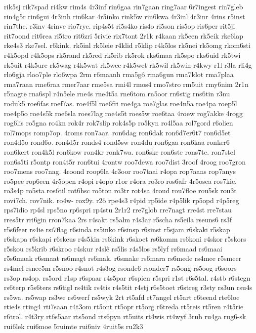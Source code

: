 {rik5sj
rik7spad
ri4kw
rim4s
4r3inf
rin6gaa
rin7gaan
ring7aar
6r7ingest
rin7gleb
rin4g5r
rin6gui
4r3inh
rin6kar
4r5inko
rink5w
rin6kwa
4r3inl
4r3inr
4rins
r5inst
rin7the.
r3inv
4rinve
rio7rye.
rip4s5t
ri5s4ko
ris4o
ri5son
ris5op
ris6per
rit5ji
rit7oond
rit6rea
ri5tro
rit6zri
5rivie
rix7tont
2r1k
r4kaan
rk5een
rk5eik
rke6lap
rke4s3
rke7sel.
r6kink.
rk5inl
rk5leie
r4klid
r5klip
r4k5los
rk5nei
rk5omg
rkom6sti
r4k5opd
r4k5ops
rk5rand
rk5red
rk5rib
rk5rok
rks6maa
rk5spo
rks6uid
rk5twi
rk5uit
r4k5ure
rk5wag
r4k5wat
rk5wee
r4k5wet
rk5wil
rk5win
r4kwy
r1l
r3la
rli4g
rlo6gja
rloo7ple
rlo6wpa
2rm
r6maanh
rma5gô
rma6gun
rma7klot
rma7plaa
rma7raan
rme6raa
rmer7aar
rme5sa
rmi4l
rmos4
rmo7stro
rm5uit
rmy6nim
2r1n
r5nagte
rna6spl
r4n5ele
rne4s
rne4t5a
rne6tom
rn5oor
rn6stig
rns6tin
r3nu
roduk5
roe6fas
roef7as.
roe4f5l
roe6fri
roe4ga
roe7glas
roe4n5a
roe4pa
roep5l
roe4p5o
roe4s5k
roe6sla
roes7lag
roe4s5t
roes5w
roe6taa
4roew
rog7akke
4rogg
rog6lis
ro5gna
ro4kn
rok4r
rok7slip
rok4s5p
ro5kyn
ro4l5aa
rol7gord
r6olien
rol7mops
romp7op.
4roms
ron7aar.
ron6dag
ron6dak
ron6d7er6t7
ron6d5et
ron4d5o
rond6o.
ron4d5r
ronds4
rond5sw
ron4du
ron6gaa
ron6kaa
ronker6
ron6kert
ron4k5l
ron6kow
ron4kr
ronk7wa.
ron6ske
ron6ste
rons7te.
ron7stel
ron6s5ti
r5ontp
ron4t5r
ron6tui
4rontw
roo7dewa
roo7dist
3roof
4roog
roo7gron
roo7mens
roo7nag.
4roond
roop6la
4r3oor
roo7taai
r4opa
rop7aans
rop7anys
ro5pee
rop6een
4r5open
r4opi
r4opo
r1or
r4ora
ro3ro
ros6afr
4r5osea
ros7kie.
ro3s4p
ro5sta
ros6til
rot6hsc
ro5ton
ro3tr
rot4sa
4roud
rou7floe
rou5sk
rou3t
rovi7ch.
rov7nik.
ro4w-
rox9y.
r2ö
rpe4s3
r4pid
rp5ide
r4p5lik
rp5opd
r4p5reg
rps7idio
rp4sl
rps5no
rp6spri
rp4stu
2r1r2
rre7glob
rre7nagt
rre4st
rre7stau
rres5tr
rri6gin
rron7kaa
2rs
r4sakt
rs5alm
r4s3ar
r5scha
rs5eila
rseuns6
rs3f
r5s6feer
rs4ie
rsi7flag
r6sinda
rs5inko
r6sinsp
r6sinst
r5sjam
r6skaki
r5skap
r6skapa
r6skapi
r6skeus
r4s5kin
rs6kink
r6skoet
rs6komm
rs6koni
r4skor
r5skors
r5skou
rs5krib
r6skroo
r4skur
r4slê
rs5lis
r4s5los
rs5lyf
rs6maad
rs6maai
r5s6maak
r6smaat
rs6magt
rs6mak.
r6smake
rs6mara
rs6mede
rs4mee
r5smeer
rs4mel
rsnee5m
r5snoo
r4snot
r4s3og
rsonde6
rsonder7
rs5ong
rs5oog
r6soors
rs3op
rs4op.
rs5ord
r1sp
r6spaar
r4s5par
r6spien
r5spri
r1st
r6s5tal.
r4stb
r6stegn
rs6terp
r5s6ters
rs6tigl
rs4tik
rs4tis
r4s5tit
r4stj
r6s5toet
r6streg
r3sty
rs3un
rsu4s
rs5wa.
rs5wap
rs3we
rs6werf
rs5wyk
2rt
rt5afd
rt7angel
rt5art
r6teend
rte6loe
rtie4s
rting4
rti7saan
r4t3om
rt5ont
rt5opr
rt5org
r6treda
rt5reis
rt5ren
r4t5rie
r6trol.
r4t3ry
rt6s5aar
rts5ond
rts6pyn
rt5uits
rt4wis
rt4wyf
3rub
ru4ga
rug6-sk
rui6lek
rui6moe
5ruimte
rui6niv
4ruit5s
ru2k3
}
